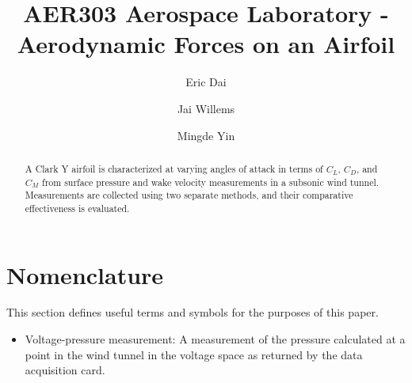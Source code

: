 \documentclass[runningheads]{llncs}
\begin{document}
\title{AER303 Aerospace Laboratory - Aerodynamic Forces on an Airfoil}

\author{Eric Dai \and Jai Willems \and Mingde Yin}


\maketitle




\begin{abstract}

A Clark Y airfoil is characterized at varying angles of attack in terms of $C_L$, $C_D$, and $C_M$ from surface pressure and wake velocity measurements in a subsonic wind tunnel. Measurements are collected using two separate methods, and their comparative effectiveness is evaluated.

\end{abstract}




\section*{Nomenclature}

This section defines useful terms and symbols for the purposes of this paper.

\begin{itemize}
    \item Voltage-pressure measurement: A measurement of the pressure calculated at a point in the wind tunnel in the voltage space as returned by the data acquisition card.
\end{itemize}
\end{document}
